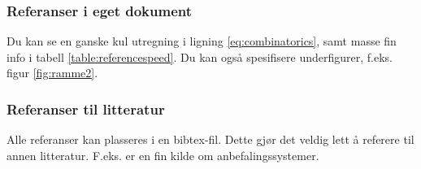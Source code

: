 \documentclass[a4paper]{article}
\begin{document}
\subsubsection{Referanser i eget dokument}

Du kan se en ganske kul utregning i ligning \ref{eq:combinatorics}, samt masse fin info i tabell \ref{table:referencespeed}. Du kan også spesifisere underfigurer, f.eks. figur \ref{fig:ramme2}.

\subsubsection{Referanser til litteratur}

Alle referanser kan plasseres i en bibtex-fil. Dette gjør det veldig lett å referere til annen litteratur. F.eks. er \cite{tintarev2007survey} en fin kilde om anbefalingssystemer.



\end{document}
